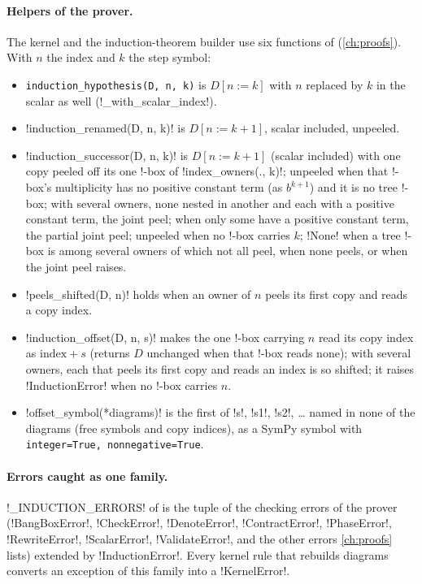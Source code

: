 \paragraph{Helpers of the prover.} The kernel and the induction-theorem builder use six functions of  (\cref{ch:proofs}). With $n$ the index and $k$ the step symbol:
\begin{itemize}
\item \texttt{induction\_\allowbreak{}hypothesis(\allowbreak{}D,\allowbreak{} n,\allowbreak{} k)} is $D[n:=k]$ with $n$ replaced by $k$ in the scalar as well (\py!_with_scalar_index!).
\item \py!induction_renamed(D, n, k)! is $D[n:=k+1]$, scalar included, unpeeled.
\item \py!induction_successor(D, n, k)! is $D[n:=k+1]$ (scalar included) with one copy peeled off its one !-box of \py!index_owners(., k)!; unpeeled when that !-box's multiplicity has no positive constant term (as $b^{k+1}$) and it is no tree !-box; with several owners, none nested in another and each with a positive constant term, the joint peel; when only some have a positive constant term, the partial joint peel; unpeeled when no !-box carries $k$; \py!None! when a tree !-box is among several owners of which not all peel, when none peels, or when the joint peel raises.
\item \py!peels_shifted(D, n)! holds when an owner of $n$ peels its first copy and reads a copy index.
\item \py!induction_offset(D, n, s)! makes the one !-box carrying $n$ read its copy index as $\text{index}+s$ (returns $D$ unchanged when that !-box reads none); with several owners, each that peels its first copy and reads an index is so shifted; it raises \py!InductionError! when no !-box carries $n$.
\item \py!offset_symbol(*diagrams)! is the first of \code!s!, \code!s1!, \code!s2!, \ldots{} named in none of the diagrams (free symbols and copy indices), as a SymPy symbol with \texttt{integer=True,\allowbreak{} nonnegative=True}.
\end{itemize}

\paragraph{Errors caught as one family.} \py!_INDUCTION_ERRORS! of  is the tuple of the checking errors of the prover (\py!BangBoxError!, \py!CheckError!, \py!DenoteError!, \py!ContractError!, \py!PhaseError!, \py!RewriteError!, \py!ScalarError!, \py!ValidateError!, and the other errors \cref{ch:proofs} lists) extended by \py!InductionError!. Every kernel rule that rebuilds diagrams converts an exception of this family into a \py!KernelError!.

